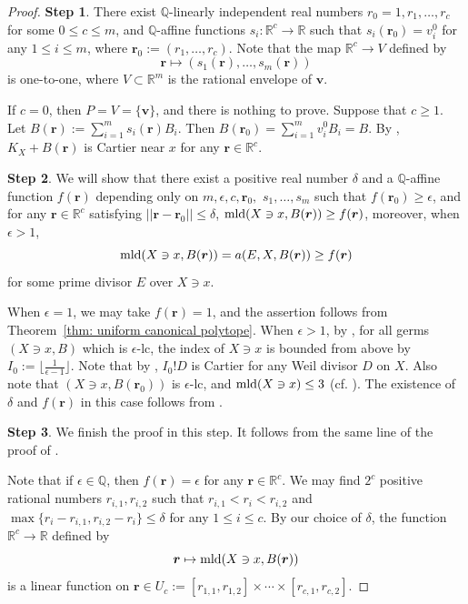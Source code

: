 \documentclass[11pt]{amsart}
\numberwithin{equation}{section}
\newcommand\luo[1]{\todo[color=red!40]{#1}} %
\newcommand{\Qq}{\mathbb{Q}}
\newcommand{\Rr}{\mathbb{R}}
\newcommand{\mld}{{\rm{mld}}}
\theoremstyle{definition}
\theoremstyle{definition}
\begin{document}
\begin{proof}
\noindent\textbf{Step 1}. There exist $\Qq$-linearly independent real numbers $r_0=1,r_1,\ldots,r_c$ for some $0\le c\le m$, and $\Qq$-affine functions $s_i:\Rr^{c}\to \Rr$ such that $s_i(\bm{r}_0)=v_i^0$ for any $1\le i\le m$, where $\bm{r}_0:=(r_1,\dots,r_c)$. Note that the map $\Rr^c\to V$ defined by $$\bm{r}\mapsto (s_1(\bm{r}),\dots,s_m(\bm{r}))$$ is one-to-one, where $V\subset\Rr^m$ is the rational envelope of $\bm{v}$.
      
If $c=0$, then $P=V=\{\bm{v}\}$, and there is nothing to prove. Suppose that $c\ge1$. Let $B(\bm{r}):=\sum_{i=1}^m s_i(\bm{r})B_i$. Then $B(\bm{r}_0)=\sum_{i=1}^m v_i^0B_{i}=B$. By \cite[Lemma 5.4(1)]{HLS19}, $K_X+B(\bm{r})$ is Cartier near $x$ for any $\bm{r}\in\Rr^c$. 

\medskip

\noindent\textbf{Step 2}. We will show that there exist a positive real number $\delta$ and a $\Qq$-affine function $f(\bm{r})$ depending only on $m,\epsilon,c,\bm{r}_0,$ $s_1,\dots,s_m$ such that $f(\bm{r}_0)\ge\epsilon$, and for any $\bm{r}\in\Rr^c$ satisfying $||\bm{r}-\bm{r}_0||\le\delta$, $\mld(X\ni x,B(\bm{r}))\ge f(\bm{r})$, moreover, when $\epsilon>1$, $$\mld(X\ni x,B(\bm{r}))=a(E,X,B(\bm{r}))\ge f(\bm{r})$$ for some prime divisor $E$ over $X\ni x$. 

When $\epsilon=1$, we may take $f(\bm r)=1$, and the assertion follows from Theorem~\ref{thm: uniform canonical polytope}. When $\epsilon>1$, by \cite[Appendix, Theorem]{Sho92}, for all germs $(X\ni x,B)$ which is $\epsilon$-lc, the index of $X\ni x$ is bounded from above by $I_0:=\lfloor \frac{1}{\epsilon-1}\rfloor$. Note that by \cite[Lemma~5.1]{Kaw88}, $I_0!D$ is Cartier for any Weil divisor $D$ on $X$. Also note that $(X\ni x,B(\bm{r}_0))$ is $\epsilon$-lc, and $\mld(X\ni x)\le 3$ (cf. \cite[Theorem~0.1]{Amb99}). The existence of $\delta$ and $f(\bm{r})$ in this case follows from \cite[Lemma 4.7]{CH21}. 
      
\medskip

\noindent \textbf{Step 3}. We finish the proof in this step. It follows from the same line of the proof of \cite[Theorem 7.15]{CH21}. 

Note that if $\epsilon\in\Qq$, then $f(\bm{r})=\epsilon$ for any $\bm{r}\in\Rr^c$. We may find $2^c$ positive rational numbers $r_{i,1},r_{i,2}$ such that $r_{i,1}<r_i<r_{i,2}$ and $\max\{r_i-r_{i,1},r_{i,2}-r_i\}\le\delta$ for any $1\le i\le c$. By our choice of $\delta$, the function $\Rr^c\to \Rr$ defined by $$\bm{r}\mapsto \mld(X\ni x,B(\bm{r}))$$ is a linear function on $\bm{r}\in U_c:=[r_{1,1},r_{1,2}]\times\cdots\times[r_{c,1},r_{c,2}]$. 
      

\end{proof}
\end{document}
